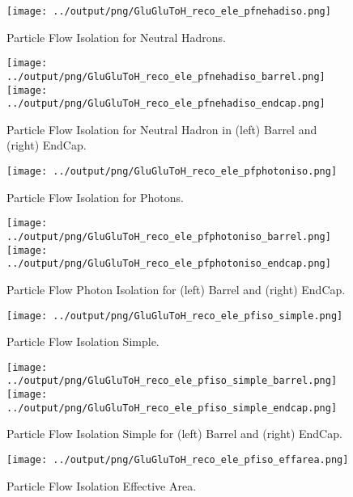 \documentclass[11pt]{book}
\begin{document}
\begin{figure}[ht]
\centering
\texttt{[image: ../output/png/GluGluToH\_reco\_ele\_pfnehadiso.png]}
\caption{Particle Flow Isolation for Neutral Hadrons.}
\label{fig:gluglu_reco_ele_pfnehadiso}
\end{figure}

\begin{figure}[ht]
\centering
\texttt{[image: ../output/png/GluGluToH\_reco\_ele\_pfnehadiso\_barrel.png]}
\texttt{[image: ../output/png/GluGluToH\_reco\_ele\_pfnehadiso\_endcap.png]}
\caption{Particle Flow Isolation for Neutral Hadron in (left) Barrel and (right) EndCap.}
\label{fig:gluglu_reco_ele_pfnehadiso_regions}
\end{figure}

\begin{figure}[ht]
\centering
\texttt{[image: ../output/png/GluGluToH\_reco\_ele\_pfphotoniso.png]}
\caption{Particle Flow Isolation for Photons.}
\label{fig:gluglu_reco_ele_pfphotoniso}
\end{figure}

\begin{figure}[ht]
\centering
\texttt{[image: ../output/png/GluGluToH\_reco\_ele\_pfphotoniso\_barrel.png]}
\texttt{[image: ../output/png/GluGluToH\_reco\_ele\_pfphotoniso\_endcap.png]}
\caption{Particle Flow Photon Isolation for (left) Barrel and (right) EndCap.}
\label{fig:gluglu_reco_ele_pfphotoniso_regions}
\end{figure}

\begin{figure}[ht]
\centering
\texttt{[image: ../output/png/GluGluToH\_reco\_ele\_pfiso\_simple.png]}
\caption{Particle Flow Isolation Simple.}
\label{fig:gluglu_reco_ele_pfiso_simple}
\end{figure}

\begin{figure}[ht]
\centering
\texttt{[image: ../output/png/GluGluToH\_reco\_ele\_pfiso\_simple\_barrel.png]}
\texttt{[image: ../output/png/GluGluToH\_reco\_ele\_pfiso\_simple\_endcap.png]}
\caption{Particle Flow Isolation Simple for (left) Barrel and (right) EndCap.}
\label{fig:gluglu_reco_ele_pfiso_simple_regions}
\end{figure}

\begin{figure}[ht]
\centering
\texttt{[image: ../output/png/GluGluToH\_reco\_ele\_pfiso\_effarea.png]}
\caption{Particle Flow Isolation Effective Area.}
\label{fig:gluglu_reco_ele_pfiso_effarea}
\end{figure}
\end{document}
